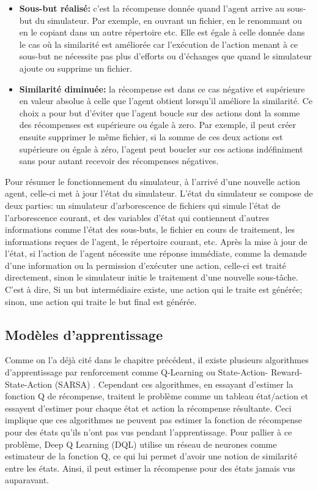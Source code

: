 \begin{itemize}
	\item \textbf{Sous-but réalisé:} c'est la récompense donnée quand l'agent arrive au sous-but du simulateur. Par exemple, en ouvrant un fichier, en le renommant ou en le copiant dans un autre répertoire etc. Elle est égale à celle donnée dans le cas où la similarité est améliorée car l'exécution de l'action menant à ce sous-but ne nécessite pas plus d'efforts ou d'échanges que quand le simulateur ajoute ou supprime un fichier.
	\item \textbf{Similarité diminuée:} la récompense est dans ce cas négative et supérieure en valeur absolue à celle que l'agent obtient lorsqu'il améliore la similarité. Ce choix a pour but d'éviter que l'agent boucle sur des actions dont la somme des récompenses est supérieure ou égale à zero. Par exemple, il peut créer ensuite supprimer le même fichier, si la somme de ces deux actions est supérieure ou égale à zéro, l'agent peut boucler sur ces actions indéfiniment sans pour autant recevoir des récompenses négatives.
\end{itemize}
Pour résumer le fonctionnement du simulateur, à l'arrivé d'une nouvelle action agent, celle-ci met à jour l'état du simulateur. L'état du simulateur se compose de deux parties: un simulateur d'arborescence de fichiers qui simule l'état de l'arborescence courant, et des variables d'état qui contiennent d'autres informations comme l'état des sous-buts, le fichier en cours de traitement, les informations reçues de l'agent, le répertoire courant, etc. Après la mise à jour de l'état, si l'action de l'agent nécessite une réponse immédiate, comme la demande d'une information ou la permission d'exécuter une action, celle-ci est traité directement, sinon le simulateur initie le traitement d'une nouvelle sous-tâche. C'est à dire, Si un but intermédiaire existe, une action qui le traite est générée; sinon, une action qui traite le but final est générée.
\subsection{Modèles d'apprentissage}\label{DQL}
Comme on l'a déjà cité dans le chapitre précédent, il existe plusieurs algorithmes d'apprentissage par renforcement comme Q-Learning ou State-Action- Reward-State-Action (SARSA) \cite{Rummery1994}. Cependant ces algorithmes, en essayant d'estimer la fonction Q de récompense, traitent le problème comme un tableau état/action et essayent d'estimer pour chaque état et action la récompense résultante. Ceci implique que ces algorithmes ne peuvent pas estimer la fonction de récompense pour des états qu'ils n'ont pas vus pendant l'apprentissage. Pour pallier à ce problème, Deep Q Learning (DQL)\cite{Mnih2015} utilise un réseau de neurones comme estimateur de la fonction Q, ce qui lui permet d'avoir une notion de similarité entre les états. Ainsi, il peut estimer la récompense pour des états jamais vus auparavant.
